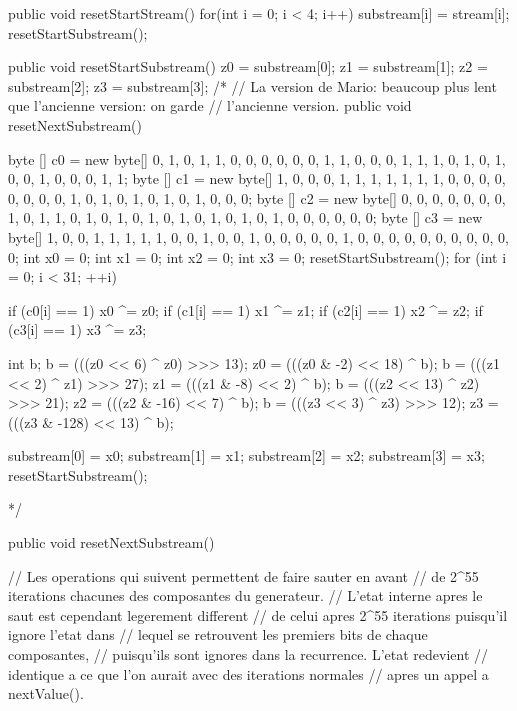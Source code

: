 \begin{code}
  \begin{hide}

   public void resetStartStream() {
      for(int i = 0; i < 4; i++)
         substream[i] = stream[i];
      resetStartSubstream();
   }

   public void resetStartSubstream() {
      z0 = substream[0];
      z1 = substream[1];
      z2 = substream[2];
      z3 = substream[3];
   }
/*
   // La version de Mario: beaucoup plus lent que l'ancienne version: on garde
   // l'ancienne version.
   public void resetNextSubstream() {
      byte [] c0 = new byte[] {0, 1, 0, 1, 1, 0, 0, 0, 0, 0, 0, 1, 1, 0, 0,
                            0, 1, 1, 1, 0, 1, 0, 1, 0, 0, 1, 0, 0, 0, 1, 1};
      byte [] c1 = new byte[] {1, 0, 0, 0, 1, 1, 1, 1, 1, 1, 1, 0, 0, 0, 0,
                            0, 0, 0, 0, 1, 0, 1, 0, 1, 0, 1, 0, 1, 0, 0, 0};
      byte [] c2 = new byte[] {0, 0, 0, 0, 0, 0, 0, 1, 0, 1, 1, 0, 1, 0, 1,
                            0, 1, 0, 1, 0, 1, 0, 1, 0, 1, 0, 0, 0, 0, 0, 0};
      byte [] c3 = new byte[] {1, 0, 0, 1, 1, 1, 1, 1, 0, 0, 1, 0, 0, 1, 0,
                            0, 0, 0, 0, 1, 0, 0, 0, 0, 0, 0, 0, 0, 0, 0, 0};
      int x0 = 0;
      int x1 = 0;
      int x2 = 0;
      int x3 = 0;
      resetStartSubstream();
      for (int i = 0; i < 31; ++i) {
         if (c0[i] == 1) x0 ^= z0;
         if (c1[i] == 1) x1 ^= z1;
         if (c2[i] == 1) x2 ^= z2;
	 if (c3[i] == 1) x3 ^= z3;

         int b;
         b  = (((z0 <<   6) ^ z0) >>> 13);
         z0 = (((z0 &   -2) << 18) ^ b);
         b  = (((z1 <<   2) ^ z1) >>> 27);
         z1 = (((z1 &   -8) <<  2) ^ b);
         b  = (((z2 <<  13) ^ z2) >>> 21);
         z2 = (((z2 &  -16) <<  7) ^ b);
         b  = (((z3 <<   3) ^ z3) >>> 12);
         z3 = (((z3 & -128) << 13) ^ b);
      }
      substream[0] = x0;
      substream[1] = x1;
      substream[2] = x2;
      substream[3] = x3;
      resetStartSubstream();
   }
*/

   public void resetNextSubstream() {
      // Les operations qui suivent permettent de faire sauter en avant
      // de 2^55 iterations chacunes des composantes du generateur.
      // L'etat interne apres le saut est cependant legerement different
      // de celui apres 2^55 iterations puisqu'il ignore l'etat dans
      // lequel se retrouvent les premiers bits de chaque composantes,
      // puisqu'ils sont ignores dans la recurrence. L'etat redevient
      // identique a ce que l'on aurait avec des iterations normales
      // apres un appel a nextValue().

}
\end{hide}
\end{code}
